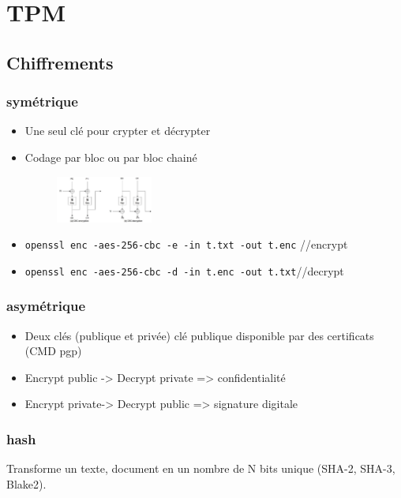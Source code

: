 \documentclass[resume]{subfiles}
\begin{document}
\section{TPM}

\subsection{Chiffrements}

\subsubsection{symétrique}

\begin{itemize}
\item Une seul clé pour crypter et décrypter
\item Codage par bloc ou par bloc chainé \begin{figure}[H]
    \centering
    \includegraphics[width=0.3\textwidth]{Figures/TPM/CBC.png}
\end{figure}
\item \verb!openssl enc -aes-256-cbc -e -in t.txt -out t.enc! //encrypt
\item \verb!openssl enc -aes-256-cbc -d -in t.enc -out t.txt!//decrypt
\end{itemize}

\subsubsection{asymétrique}
\begin{itemize}
\item Deux clés (publique et privée) clé publique disponible par des certificats (CMD pgp)
\item Encrypt public -> Decrypt private => confidentialité
\item Encrypt private-> Decrypt public => signature digitale
\end{itemize}

\subsubsection{hash}

Transforme un texte, document en un nombre de N bits unique (SHA-2, SHA-3, Blake2).
\end{document}
